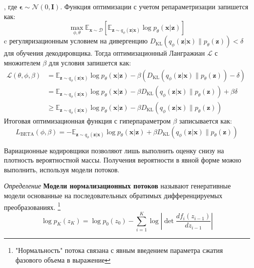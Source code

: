 , где $\boldsymbol{\epsilon} \sim \mathcal{N}(0, \boldsymbol{I})$. Функция оптимизации с учетом репараметризации запишется как:
\begin{equation}
    \max_{\phi, \theta} \mathbb{E}_{\mathbf{x}\sim\mathcal{D}}[\mathbb{E}_{\mathbf{z} \sim q_\phi(\mathbf{z}\vert\mathbf{x})} \log p_\theta(\mathbf{x}\vert\mathbf{z})]
\end{equation}
c регуляризационным условием на дивергенцию $D_\text{KL}(q_\phi(\mathbf{z}\vert\mathbf{x})\|p_\theta(\mathbf{z})) < \delta$ для обучения декодировщика. 
Тогда оптимизационный Лангражиан $\mathcal{L}$ с множителем $\beta$ для условия запишется как:
\begin{equation}
    \begin{aligned}
        \mathcal{L}(\theta, \phi, \beta) &= \mathbb{E}_{\mathbf{z} \sim q_\phi(\mathbf{z}\vert\mathbf{x})} \log p_\theta(\mathbf{x}\vert\mathbf{z}) - \beta(D_\text{KL}(q_\phi(\mathbf{z}\vert\mathbf{x})\|p_\theta(\mathbf{z})) - \delta) & \\
        & = \mathbb{E}_{\mathbf{z} \sim q_\phi(\mathbf{z}\vert\mathbf{x})} \log p_\theta(\mathbf{x}\vert\mathbf{z}) - \beta D_\text{KL}(q_\phi(\mathbf{z}\vert\mathbf{x})\|p_\theta(\mathbf{z})) + \beta \delta & \\
        & \geq \mathbb{E}_{\mathbf{z} \sim q_\phi(\mathbf{z}\vert\mathbf{x})} \log p_\theta(\mathbf{x}\vert\mathbf{z}) - \beta D_\text{KL}(q_\phi(\mathbf{z}\vert\mathbf{x})\|p_\theta(\mathbf{z}))
    \end{aligned}
\end{equation}
Итоговая оптимизационная функция с гиперпараметром $\beta$ записывается как:
$$
L_\text{BETA}(\phi, \beta) = - \mathbb{E}_{\mathbf{z} \sim q_\phi(\mathbf{z}\vert\mathbf{x})} \log p_\theta(\mathbf{x}\vert\mathbf{z}) + \beta D_\text{KL}(q_\phi(\mathbf{z}\vert\mathbf{x})\|p_\theta(\mathbf{z}))
$$

Вариационные кодировщики позволяют лишь выполнить оценку снизу на плотность вероятностной массы.
Получения вероятности в явной форме можно выполнить, используя модели потоков.

\textit{Определение } \textbf{Модели нормализационных потоков} называют генеративные модели основанные 
на последовательных обратимых дифференцируемых преобразованиях. \footnote{"Нормальность" потока связана с явным введением параметра сжатия фазового объема 
в выражение}
\begin{equation}
    \log p_{K}(z_K) = \log p_0(z_0) - \sum_{i=1}^K \log \left|\det \frac{d f_i(z_{i-1})}{d z_{i-1}} \right| 
\end{equation}

